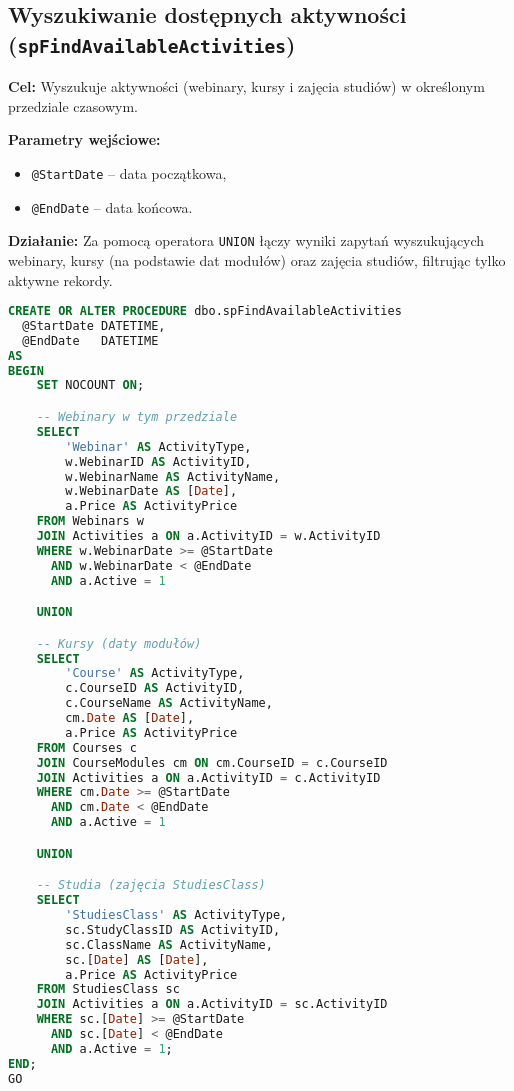 \documentclass[12pt]{article}
\begin{document}
\newpage
\subsection{Wyszukiwanie dostępnych aktywności (\texttt{spFindAvailableActivities})}
\textbf{Cel:} Wyszukuje aktywności (webinary, kursy i zajęcia studiów) w określonym przedziale czasowym.

\textbf{Parametry wejściowe:}
\begin{itemize}
  \item \texttt{@StartDate} – data początkowa,
  \item \texttt{@EndDate} – data końcowa.
\end{itemize}

\textbf{Działanie:} Za pomocą operatora \verb|UNION| łączy wyniki zapytań wyszukujących webinary, kursy (na podstawie dat modułów) oraz zajęcia studiów, filtrując tylko aktywne rekordy.

\begin{lstlisting}[language=SQL]
CREATE OR ALTER PROCEDURE dbo.spFindAvailableActivities
  @StartDate DATETIME,
  @EndDate   DATETIME
AS
BEGIN
    SET NOCOUNT ON;

    -- Webinary w tym przedziale
    SELECT
        'Webinar' AS ActivityType,
        w.WebinarID AS ActivityID,
        w.WebinarName AS ActivityName,
        w.WebinarDate AS [Date],
        a.Price AS ActivityPrice
    FROM Webinars w
    JOIN Activities a ON a.ActivityID = w.ActivityID
    WHERE w.WebinarDate >= @StartDate
      AND w.WebinarDate < @EndDate
      AND a.Active = 1

    UNION

    -- Kursy (daty modułów)
    SELECT
        'Course' AS ActivityType,
        c.CourseID AS ActivityID,
        c.CourseName AS ActivityName,
        cm.Date AS [Date],
        a.Price AS ActivityPrice
    FROM Courses c
    JOIN CourseModules cm ON cm.CourseID = c.CourseID
    JOIN Activities a ON a.ActivityID = c.ActivityID
    WHERE cm.Date >= @StartDate
      AND cm.Date < @EndDate
      AND a.Active = 1

    UNION

    -- Studia (zajęcia StudiesClass)
    SELECT
        'StudiesClass' AS ActivityType,
        sc.StudyClassID AS ActivityID,
        sc.ClassName AS ActivityName,
        sc.[Date] AS [Date],
        a.Price AS ActivityPrice
    FROM StudiesClass sc
    JOIN Activities a ON a.ActivityID = sc.ActivityID
    WHERE sc.[Date] >= @StartDate
      AND sc.[Date] < @EndDate
      AND a.Active = 1;
END;
GO
\end{lstlisting}
\end{document}
